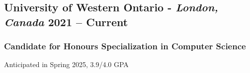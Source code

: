 \documentclass[9pt]{article}
\begin{document}
\subsection{University of Western Ontario - \normalsize\textit{London, Canada} \hfill \normalsize\textnormal{2021 -- Current}}
\subsubsection{Candidate for Honours Specialization in Computer Science} Anticipated in Spring 2025, 3.9/4.0 GPA 

\end{document}
